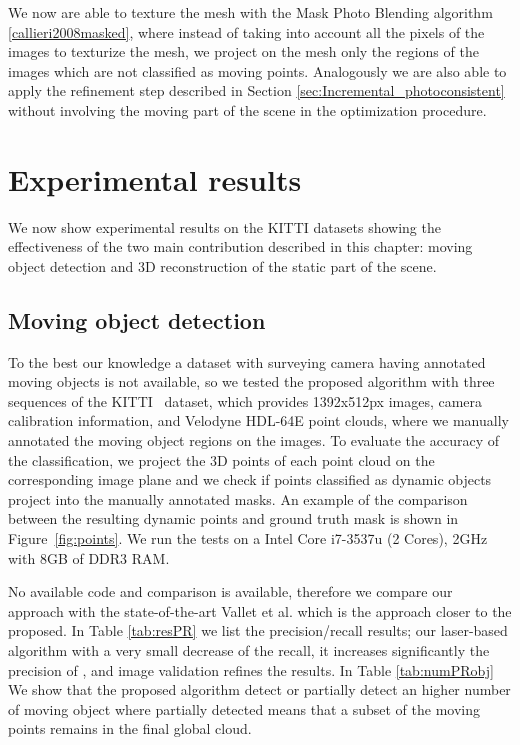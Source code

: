 We now are able to texture the mesh with the Mask Photo Blending algorithm \ref{callieri2008masked}, where instead of taking into account all the pixels of the images to texturize the mesh, we project on the mesh only the regions  of the images which are not classified as moving points. 
Analogously we are also able to apply the refinement step described in Section \ref{sec:Incremental_photoconsistent} without involving the moving part of the scene in the optimization procedure.


\section{Experimental results}%
\label{sec:experiments}
We now show experimental results on the KITTI datasets showing the effectiveness of the two main contribution described in this chapter: moving object detection and 3D reconstruction of the static part of the scene.
\subsection{Moving object detection}
To the best our knowledge a dataset with surveying camera having annotated moving objects is not available, so we tested the proposed algorithm with three sequences of the KITTI~\cite{Kitti} dataset, which provides 1392x512px images, camera calibration information, and Velodyne HDL-64E point clouds, where we manually annotated the moving object regions on the images. To evaluate the accuracy of the classification, we project the 3D points of each point cloud on the corresponding image plane and we check if points classified as dynamic objects project into the manually annotated masks. An example of the comparison between the resulting dynamic points and ground truth mask is shown in Figure~\ref{fig:points}.
We run the tests on a  Intel Core i7-3537u (2 Cores), 2GHz with 8GB of DDR3 RAM. 

No available code and comparison is available, therefore we compare our approach with the state-of-the-art Vallet et al. \cite{vallet2015extracting} which is the approach closer to the proposed.
In Table \ref{tab:resPR} we list the precision/recall results; our laser-based algorithm with a very small decrease of the recall, it increases significantly the precision of \cite{vallet2015extracting}, and image validation refines the results.
In Table \ref{tab:numPRobj} We show that the proposed algorithm detect or partially detect an higher number of moving object where  partially detected means that a subset of the moving points remains in the final global cloud.

